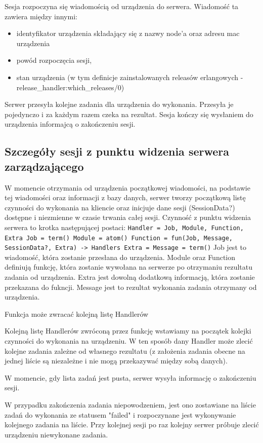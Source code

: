 \documentclass[polish,12pt]{aghthesis}
\begin{document}
Sesja rozpoczyna się wiadomością od urządzenia do serwera. Wiadomość ta zawiera między innymi:
\begin{itemize}
\item identyfikator urządzenia składający się z nazwy node'a oraz adresu mac urządzenia
\item powód rozpoczęcia sesji,
\item stan urządzenia (w tym definicje zainstalowanych releasów erlangowych - release\_handler:which\_releases/0)
\end{itemize}
Serwer przesyła kolejne zadania dla urządzenia do wykonania. Przesyła je pojedynczo i za każdym razem czeka na rezultat. Sesja kończy się wysłaniem do urządzenia informajcą o zakończeniu sesji.

\subsection{Szczegóły sesji z punktu widzenia serwera zarządzającego}
W momencie otrzymania od urządzenia początkowej wiadomości, na podstawie tej wiadomości oraz informacji z bazy danych, serwer tworzy początkową listę czynności do wykonania na kliencie oraz inicjuje dane sesji (SessionData?) dostępne i niezmienne w czasie trwania całej sesji. Czynność z punktu widzenia serwera to krotka następującej postaci: \texttt{Handler = {Job, Module, Function, Extra} Job = term() Module = atom() Function = fun(Job, Message, SessionData?, Extra) -> Handlers Extra = Message = term()} Job jest to wiadomość, która zostanie przesłana do urządzenia. Module oraz Function definiują funkcję, która zostanie wywołana na serwerze po otrzymaniu rezultatu zadania od urządzenia. Extra jest dowolną dodatkową informacją, która zostanie przekazana do fukncji. Message jest to rezultat wykonania zadania otrzymany od urządzenia.

Funkcja może zwracać kolejną listę Handlerów

Kolejną listę Handlerów zwróconą przez funkcję wstawiamy na początek kolejki czynności do wykonania na urządzeniu. W ten sposób dany Handler może zlecić kolejne zadania zależne od własnego rezultatu (z założenia zadania obecne na jednej liście są niezależne i nie mogą przekazywać między sobą danych).

W momencie, gdy lista zadań jest pusta, serwer wysyła informację o zakończeniu sesji.

W przypadku zakończenia zadania niepowodzeniem, jest ono zostawiane na liście zadań do wykonania ze statusem "failed" i rozpoczynane jest wykonywanie kolejnego zadania na liście. Przy kolejnej sesji po raz kolejny serwer próbuje zlecić urządzeniu niewykonane zadania.
\end{document}
